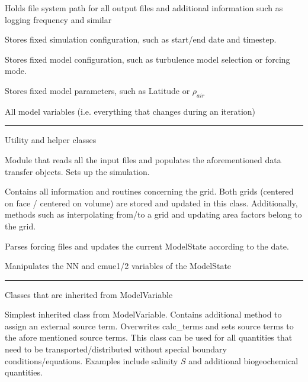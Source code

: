 \documentclass[paper=a4, fontsize=12pt]{article}
\begin{document}
\begin{description}[style=nextline]
\begin{description}[style=multiline, leftmargin=17em]
		\item[OutputConfig] Holds file system path for all output files and additional information such as logging frequency and similar
		
		\item[SimConfig] Stores fixed simulation configuration, such as start/end date and timestep. 

		\item[ModelConfig] Stores fixed model configuration, such as turbulence model selection or forcing mode.
		
		\item[ModelParam] Stores fixed model parameters, such as Latitude or $\rho_{air}$
		
		\item[ModelState] All model variables (i.e. everything that changes during an iteration)
\end{description}

 \hrule
\item[Special classes] \noindent Utility and helper classes  
 \begin{description}[style=multiline, leftmargin=17em]
		\item[Inputfile] Module that reads all the input files and populates the aforementioned data transfer objects. Sets up the simulation.
		
		\item[Grid] Contains all information and routines concerning the grid. Both grids (centered on face / centered on volume) are stored and updated in this class. Additionally, methods such as interpolating from/to a grid and updating area factors belong to the grid.
		
		\item[Forcing] Parses forcing files and updates the current ModelState according to the date.

		\item[Stability] Manipulates the NN and cmue1/2 variables of the ModelState
\end{description}

 \hrule
\item[Model state variable classes] \noindent Classes that are inherited from ModelVariable
 \begin{description}[style=multiline, leftmargin=17em]
		\item[TranspModelVar] Simplest inherited class from ModelVariable.  Contains additional method to assign an external source term. Overwrites calc\_terms and sets source terms to the afore mentioned source terms. This class can be used for all quantities that need to be transported/distributed without special boundary conditions/equations. Examples include salinity $S$ and additional biogeochemical quantities.
		

\end{description}
\end{description}
\end{document}
